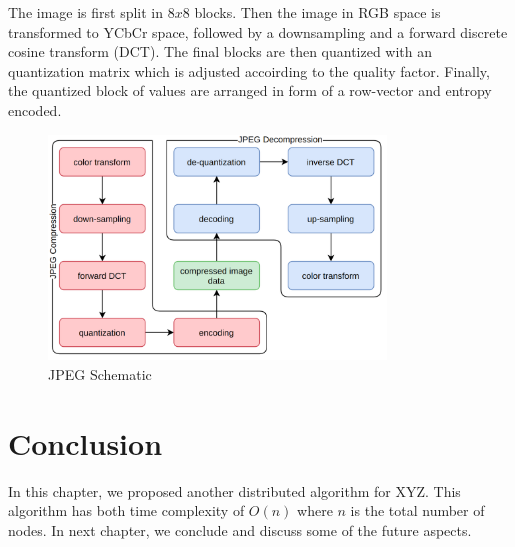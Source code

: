 The image is first split in $8x8$ blocks. Then the image in RGB space is transformed to YCbCr space, followed by a downsampling and a forward discrete cosine transform (DCT). The final blocks are then quantized with an quantization matrix which is adjusted accoirding to the quality factor. Finally, the quantized block of values are arranged in form of a row-vector and entropy encoded.

\begin{figure}[!ht]
    \centering
    \includegraphics[width=0.80\textwidth]{../fig/chapter5/jpeg-codec.png}
    \caption{JPEG Schematic}
    \label{fig:jpegSchematic}
\end{figure}




\section{Conclusion}
In this chapter, we proposed another distributed algorithm for
XYZ. This algorithm has both time complexity of $O(n)$ where $n$
is the total number of nodes.  In next chapter, we conclude and
discuss some of the future aspects.